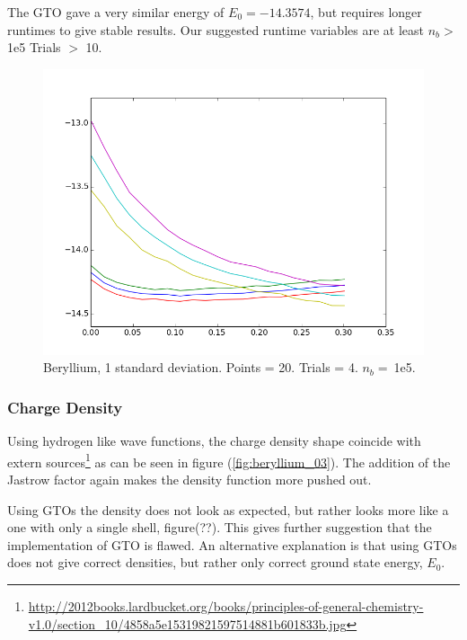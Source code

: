 \documentclass[twocolumn,fleqn,8pt]{article}  %
\begin{document}
The GTO gave a very similar energy of $E_0 = -14.3574$, but requires longer runtimes to give 
stable results. Our suggested runtime variables are at least $n_b > \:$1e5 Trials $>$ 10.
\begin{figure}
	\includegraphics[width=\columnwidth]{../res/plot/beryllium_01/beryllium_01.png}
	\caption{Beryllium, 1 standard deviation. 
	Points = 20. Trials = 4.	$n_b = \:$1e5.}
	\label{fig:beryllium_01}
\end{figure}

\subsubsection{Charge Density}
Using hydrogen like wave functions, the charge density shape coincide with extern 
sources\footnote{\url{http://2012books.lardbucket.org/books/principles-of-general-chemistry-v1.0/section_10/4858a5e15319821597514881b601833b.jpg}} as can be seen in figure
(\ref{fig:beryllium_03}). The addition of the Jastrow factor again makes the
density function more pushed out. 

Using GTOs the density does not look as expected, but rather
looks more like a one with only a single shell, figure(??). This gives further suggestion that 
the implementation of GTO is flawed. An alternative explanation is that using
GTOs does not give correct densities, but rather only correct ground state energy, $E_0$.
\end{document}
